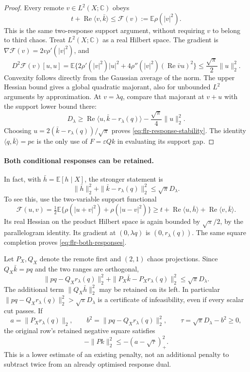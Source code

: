 \begin{proof}
Every remote $v\in L^2(X;\mathbb C)$ obeys
\[
 t+\operatorname{Re}\langle v,\bar k\rangle
 \le\mathcal F(v):=\mathbb E\rho(|v|^2).
\]
This is the same two-response support argument, without requiring
$v$ to belong to third chaos. Treat $L^2(X;\mathbb C)$ as a real
Hilbert space. The gradient is
$\nabla\mathcal F(v)=2v\rho'(|v|^2)$, and
\[
 D^2\mathcal F(v)[u,u]
 =\mathbb E\{2\rho'(|v|^2)|u|^2
       +4\rho''(|v|^2)(\operatorname{Re}\bar vu)^2\}
 \le\frac{\sqrt\pi}{2}\|u\|_2^2.
\]
Convexity follows directly from the Gaussian average of the norm.
The upper Hessian bound gives a global quadratic majorant, also for
unbounded $L^2$ arguments by approximation. At $v=\lambda q$,
compare that majorant at $v+u$ with the support lower bound there:
\[
 D_\lambda\ge
 \operatorname{Re}\langle u,\bar k-r_\lambda(q)\rangle
       -\frac{\sqrt\pi}{4}\|u\|_2^2.
\]
Choosing $u=2(\bar k-r_\lambda(q))/\sqrt\pi$ proves
\eqref{eq:flr-response-stability}. The identity
$\langle q,\bar k\rangle=pe$ is the only use of $F=\varepsilon Qk$
in evaluating its support gap.
\end{proof}

\paragraph{Both conditional responses can be retained.}
In fact, with $\bar h=\mathbb E[h\mid X]$, the stronger statement is
\begin{equation}\label{eq:flr-both-responses}
 \boxed{\quad\|\bar h\|_2^2+
 \|\bar k-r_\lambda(q)\|_2^2\le\sqrt\pi D_\lambda.\quad}
\end{equation}
To see this, use the two-variable support functional
\[
 \mathcal F(u,v)=\tfrac12\mathbb E\{\rho(|u+v|^2)+\rho(|u-v|^2)\}
 \ge t+\operatorname{Re}\langle u,\bar h\rangle
          +\operatorname{Re}\langle v,\bar k\rangle.
\]
Its real Hessian on the product Hilbert space is again bounded by
$\sqrt\pi/2$, by the parallelogram identity. Its gradient at
$(0,\lambda q)$ is $(0,r_\lambda(q))$. The same square completion
proves \eqref{eq:flr-both-responses}.

Let $P_X,Q_X$ denote the remote first and $(2,1)$ chaos projections.
Since $Q_X\bar k=pq$ and the two ranges are orthogonal,
\begin{equation}\label{eq:flr-joint}
 \boxed{\quad
 \|pq-Q_Xr_\lambda(q)\|_2^2
 +\|P_X\bar k-P_Xr_\lambda(q)\|_2^2
 \le\sqrt\pi D_\lambda.\quad}
\end{equation}
The additional term $\|Q_X\bar h\|_2^2$ may be retained on its left.
In particular $\|pq-Q_Xr_\lambda(q)\|_2^2>\sqrt\pi D_\lambda$
is a certificate of infeasibility, even if every scalar cut passes.
If
\[
 a=\|P_Xr_\lambda(q)\|_2,\qquad
 b^2=\|pq-Q_Xr_\lambda(q)\|_2^2,\qquad
 \tau=\sqrt\pi D_\lambda-b^2\ge0,
\]
the original row's retained negative square satisfies
\begin{equation}\label{eq:flr-penalty}
 -\|Pk\|_2^2\le-(a-\sqrt\tau)_+^2.
\end{equation}
This is a lower estimate of an existing penalty, not an additional
penalty to subtract twice from an already optimised response dual.

